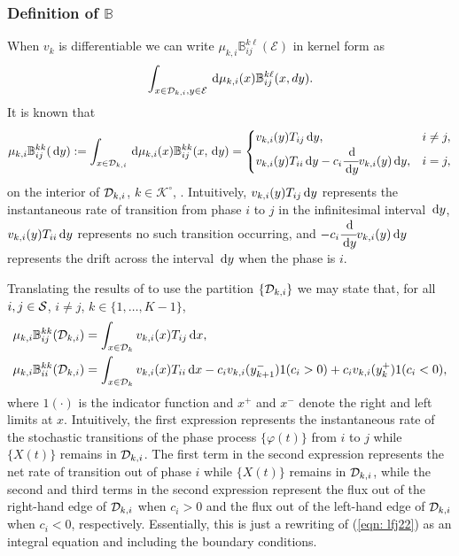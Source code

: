 \subsubsection{Definition of \(\mathbb B\)}
When \(v_k\) is differentiable we can write \(\mu_{k,i}\mathbb B_{ij}^{k\ell}(\mathcal{E})\) in kernel form as \[\displaystyle\int_{x\in\mathcal{D}_{k,i},y\in\mathcal{E}}\, \mathrm{d} \mu_{k,i}(x)\mathbb B_{ij}^{k\ell}(x,dy).\] It is known that
\begin{align}\label{eqn: lfj22}\mu_{k,i}\mathbb B_{ij}^{kk}(\, \mathrm{d} y):=\int_{x\in\mathcal{D}_{k,i}}\, \mathrm{d}\mu_{k,i}(x)\mathbb B_{ij}^{kk}(x,\, \mathrm{d} y)=\begin{cases}
v_{k,i}(y)T_{ij}\, \mathrm{d} y, & i\neq j,\\
v_{k,i}(y)T_{ii}\, \mathrm{d} y - c_i\cfrac{\, \mathrm{d}}{\, \mathrm{d} y}v_{k,i}(y)\, \mathrm{d} y, & i=j, 
\end{cases}\end{align}
on the interior of \(\mathcal{D}_{k,i}\), \(k\in\mathcal K^\circ\), \citep{kk1995}. Intuitively, \(v_{k,i}(y)T_{ij}\, \mathrm{d} y\) represents the instantaneous rate of transition from phase \(i\) to \(j\) in the infinitesimal interval \(\, \mathrm{d} y\), \(v_{k,i}(y)T_{ii}\, \mathrm{d} y\) represents no such transition occurring, and \(- c_i\cfrac{\, \mathrm{d}}{\, \mathrm{d} y}v_{k,i}(y)\, \mathrm{d} y\) represents the drift across the interval \(\, \mathrm{d} y\) when the phase is \(i\). 

Translating the results of \cite{bo2014} to use the partition \(\{\mathcal{D}_{k,i}\}\) we may state that, for all \(i,j\in\mathcal{S}\), \(i\neq j\), \(k\in\{1,\dots,K-1\}\),
\begin{align*}
	\mu_{k,i}\mathbb B_{ij}^{kk}(\mathcal{D}_{k,i})&=\int_{x\in\mathcal{D}_k}v_{k,i}(x)T_{ij}\, \mathrm{d} x,\\
	\mu_{k,i}\mathbb B_{ii}^{kk}(\mathcal{D}_{k,i})&=\int_{x\in\mathcal{D}_k}v_{k,i}(x)T_{ii}\, \mathrm{d} x - c_iv_{k,i}(y_{k+1}^-) 1{(c_i>0)} + c_iv_{k,i}(y_{k}^+) 1{(c_i<0)},
\end{align*}
where \( 1(\cdot)\) is the indicator function and \(x^+\) and \(x^-\) denote the right and left limits at \(x\). 
Intuitively, the first expression represents the instantaneous rate of the stochastic transitions of the phase process \(\{\varphi(t)\}\) from \(i\) to \(j\) while \(\{X(t)\}\) remains in \(\mathcal{D}_{k,i}\). The first term in the second expression represents the net rate of transition out of phase \(i\) while \(\{X(t)\}\) remains in \(\mathcal{D}_{k,i}\), while the second and third terms in the second expression represent the flux out of the right-hand edge of \(\mathcal{D}_{k,i}\) when \(c_i>0\) and the flux out of the left-hand edge of \(\mathcal{D}_{k,i}\) when \(c_i<0\), respectively. Essentially, this is just a rewriting of (\ref{eqn: lfj22}) as an integral equation and including the boundary conditions.

